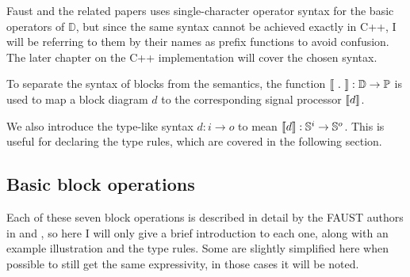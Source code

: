 \begin{description}
        Faust and the related papers\autocite{orlarey2002,orlarey2004} uses single-character operator syntax for the basic
        operators of $\mathbb D$, but since the same syntax cannot be achieved exactly in C++, I will be
        referring to them by their names as prefix functions to avoid confusion. The later chapter on the C++
        implementation will cover the chosen syntax.

        To separate the syntax of blocks from the semantics, the function $\llbracket \ .\  \rrbracket : \mathbb D
          \rightarrow \mathbb P$ is used to map a
        block diagram $d$ to the corresponding signal processor $\llbracket d \rrbracket$.

        We also introduce the type-like syntax $d : i \rightarrow o$ to mean $\llbracket d \rrbracket : \mathbb{S}^i \rightarrow \mathbb{S}^o$. This is useful
        for declaring the type rules, which are covered in the following section.
\end{description}

\subsection{Basic block operations}
Each of these seven block operations is described in detail by the FAUST authors in \autocite{orlarey2002}
and \autocite{orlarey2004}, so here I will only give a brief introduction to each one, along with an example
illustration and the type rules. Some are slightly simplified here when possible to still get the same
expressivity, in those cases it will be noted.

